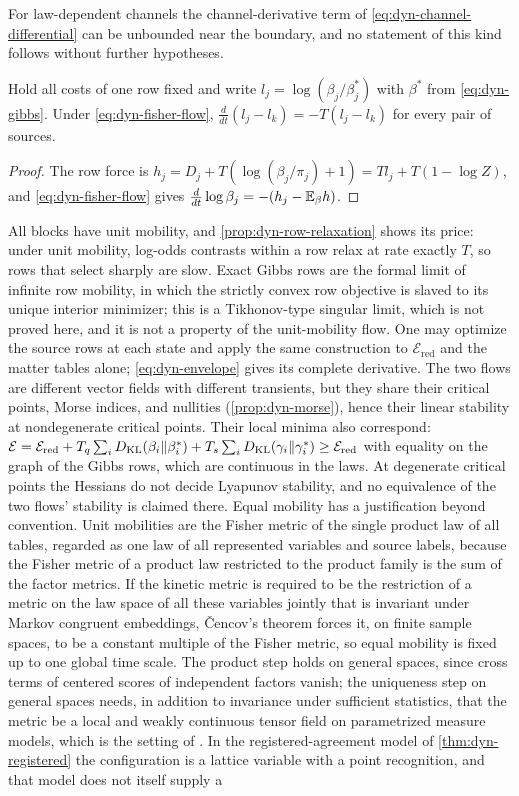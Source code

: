 For law-dependent channels the channel-derivative term of \cref{eq:dyn-channel-differential} can be unbounded near the boundary, and no statement of this kind follows without further hypotheses.

Hold all costs of one row fixed and write $l_j=\log(\beta_j/\beta_j^*)$ with $\beta^*$ from \cref{eq:dyn-gibbs}. Under \cref{eq:dyn-fisher-flow}, $\frac{d}{dt}(l_j-l_k)=-T(l_j-l_k)$ for every pair of sources.
\begin{proof}
The row force is $h_j=D_j+T(\log(\beta_j/\pi_j)+1)=Tl_j+T(1-\log Z)$, and \cref{eq:dyn-fisher-flow} gives $\frac{d}{dt}\log\beta_j=-(h_j-\mathbb E_\beta h)$.
\end{proof}

All blocks have unit mobility, and \cref{prop:dyn-row-relaxation} shows its price: under unit mobility, log-odds contrasts within a row relax at rate exactly $T$, so rows that select sharply are slow. Exact Gibbs rows are the formal limit of infinite row mobility, in which the strictly convex row objective is slaved to its unique interior minimizer; this is a Tikhonov-type singular limit, which is not proved here, and it is not a property of the unit-mobility flow. One may optimize the source rows at each state and apply the same construction to $\mathcal E_{\mathrm{red}}$ and the matter tables alone; \cref{eq:dyn-envelope} gives its complete derivative. The two flows are different vector fields with different transients, but they share their critical points, Morse indices, and nullities (\cref{prop:dyn-morse}), hence their linear stability at nondegenerate critical points. Their local minima also correspond: $\mathcal E=\mathcal E_{\mathrm{red}}+T_q\sum_iD_{\mathrm{KL}}(\beta_i\Vert\beta_i^*)+T_s\sum_iD_{\mathrm{KL}}(\gamma_i\Vert\gamma_i^*)\geq\mathcal E_{\mathrm{red}}$ with equality on the graph of the Gibbs rows, which are continuous in the laws. At degenerate critical points the Hessians do not decide Lyapunov stability, and no equivalence of the two flows' stability is claimed there. Equal mobility has a justification beyond convention. Unit mobilities are the Fisher metric of the single product law of all tables, regarded as one law of all represented variables and source labels, because the Fisher metric of a product law restricted to the product family is the sum of the factor metrics. If the kinetic metric is required to be the restriction of a metric on the law space of all these variables jointly that is invariant under Markov congruent embeddings, \v{C}encov's theorem \citep{Cencov1982} forces it, on finite sample spaces, to be a constant multiple of the Fisher metric, so equal mobility is fixed up to one global time scale. The product step holds on general spaces, since cross terms of centered scores of independent factors vanish; the uniqueness step on general spaces needs, in addition to invariance under sufficient statistics, that the metric be a local and weakly continuous tensor field on parametrized measure models, which is the setting of \citet{AyJostLeSchwachhofer2015}. In the registered-agreement model of \cref{thm:dyn-registered} the configuration is a lattice variable with a point recognition, and that model does not itself supply a 